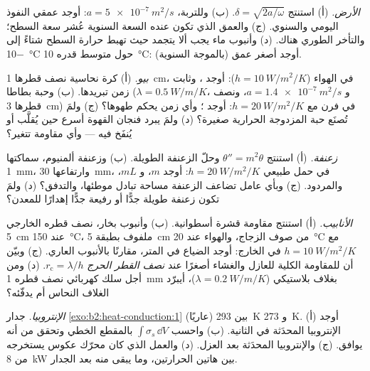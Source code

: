 \begin{exercise}[$\star\star$]\label{exo:b2:heat-conduction:6}
\emph{الأرض.} (أ) استنتج $\delta = \sqrt{2a/\omega}$. (ب) وللتربة،
$a = \qty{5e-7}{m^2/s}$: أوجد عمقي النفوذ اليومي والسنوي. (ج) والعمق
الذي تكون عنده السعة السنوية عُشر سعة السطح؛ والتأخر الطوري
هناك. (د) وأنبوب ماء يجب ألا يتجمد حيث تهبط حرارة السطح شتاءً
إلى \qty{-10}{\celsius} حول متوسط قدره
\qty{10}{\celsius}: أوجد أصغر عمق (بالموجة السنوية).
\end{exercise}

\begin{exercise}[$\star\star$]\label{exo:b2:heat-conduction:7}
\emph{بيو.} (أ) كرة نحاسية نصف قطرها \qty{1}{cm}، في الهواء ($h =
\qty{10}{W/m^2/K}$): أوجد ، وثابت زمن تبريدها. (ب) وحبة
بطاطا ($\lambda = \qty{0.5}{W/m/K}$، و $a = \qty{1.4e-7}{m^2/s}$، ونصف قطرها
\qty{3}{cm}) في فرن مع $h = \qty{20}{W/m^2/K}$: أوجد ؛ وأي
زمن يحكم طهوها؟ (ج) ولمَ تُصنَع حبة المزدوجة الحرارية صغيرة؟
(د) ولمَ يبرد فنجان القهوة أسرع حين يُقلَّب أو يُنفَخ فيه ---
وأي مقاومة تتغير؟
\end{exercise}

\begin{exercise}[$\star\star$]\label{exo:b2:heat-conduction:8}
\emph{زعنفة.} (أ) استنتج $\theta'' = m^2\theta$ وحلّ الزعنفة الطويلة.
(ب) وزعنفة ألمنيوم، سماكتها \qty{1}{mm}، وارتفاعها \qty{30}{mm}، في حمل
طبيعي $h = \qty{20}{W/m^2/K}$: أوجد $m$، و $mL$، والمردود. (ج) وبأي
عامل تضاعف الزعنفة مساحة تبادل موطئها، والتدفق؟ (د) ولمَ تكون زعنفة طويلة جدًّا أو رفيعة جدًّا إهدارًا للمعدن؟
\end{exercise}

\begin{exercise}[$\star\star$]\label{exo:b2:heat-conduction:9}
\emph{الأنابيب.} (أ) استنتج مقاومة قشرة أسطوانية. (ب) وأنبوب
بخار، نصف قطره الخارجي \qty{5}{cm} عند \qty{150}{\celsius}، ملفوف بطبقة
\qty{5}{cm} من صوف الزجاج، والهواء عند \qty{20}{\celsius} مع $h =
\qty{10}{W/m^2/K}$ في الخارج: أوجد الضياع في المتر، مقارنًا بالأنبوب العاري.
(ج) وبيّن أن للمقاومة الكلية للعازل والغشاء
أصغرًا عند \emph{نصف القطر الحرج} $r_{\text{c}} = \lambda/h$. (د) ومن أجل
سلك كهربائي نصف قطره \qty{1}{mm} بغلاف بلاستيكي ($\lambda =
\qty{0.2}{W/m/K}$)، أيبرّد الغلاف النحاس أم يدفّئه؟
\end{exercise}

\begin{exercise}[$\star\star\star$]\label{exo:b2:heat-conduction:10}
\emph{الإنتروبيا.} جدار \cref{exo:b2:heat-conduction:1} (عاريًا)
بين \qty{293}{K} و \qty{273}{K}. (أ) أوجد الإنتروبيا المحدَثة في الثانية.
(ب) واحسب $\int\sigma_s\,\dd V$ بالمقطع الخطي وتحقق من أنه
يوافق. (ج) والإنتروبيا المحدَثة بعد العزل. (د) والعمل الذي كان
محرّك عكوس يستخرجه من \qty{8}{kW} بين
هاتين الحرارتين، وما يبقى منه بعد الجدار.
\end{exercise}

